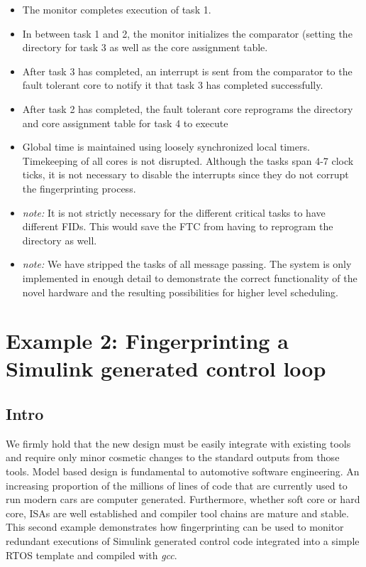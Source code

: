 \begin{itemize}
\item The monitor completes execution of task 1.
\item In between task 1 and 2, the monitor initializes the comparator (setting the directory for task 3 as well as the core assignment table.
\item After task 3 has completed, an interrupt is sent from the comparator to the fault tolerant core to notify it that task 3 has completed successfully.
\item After task 2 has completed, the fault tolerant core reprograms the directory and core assignment table for task 4 to execute
\item Global time is maintained using loosely synchronized local timers. Timekeeping of all cores is not disrupted. Although the tasks span 4-7 clock ticks, it is not necessary to disable the interrupts since they do not corrupt the fingerprinting process.
\item \emph{note:} It is not strictly necessary for the different critical tasks to have different FIDs. This would save the FTC from having to reprogram the directory as well.
\item \emph{note:} We have stripped the tasks of all message passing. The system is only implemented in enough detail to demonstrate the correct functionality of the novel hardware and the resulting possibilities for higher level scheduling.
\end{itemize}

\section{Example 2: Fingerprinting a Simulink generated control loop}
\subsection{Intro}

We firmly hold that the new design must be easily integrate with existing tools and require only minor cosmetic changes to the standard outputs from those tools. Model based design is fundamental to automotive software engineering. An increasing proportion of the millions of lines of code that are currently used to run modern cars are computer generated. Furthermore, whether soft core or hard core, ISAs are well established and compiler tool chains are mature and stable. This second example demonstrates how fingerprinting can be used to monitor redundant executions of Simulink generated control code integrated into a simple RTOS template and compiled with \emph{gcc}.

